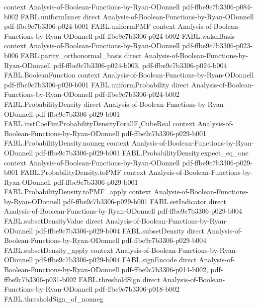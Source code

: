 \begin{theorem}
  {context}
  {Analysis-of-Boolean-Functions-by-Ryan-ODonnell}
  {pdf-ffbe9c7b3306-p084-b002}
\proofstep
  {FABL.uniformInner}
  {direct}
  {Analysis-of-Boolean-Functions-by-Ryan-ODonnell}
  {pdf-ffbe9c7b3306-p024-b001}
\proofstep
  {FABL.uniformPMF}
  {context}
  {Analysis-of-Boolean-Functions-by-Ryan-ODonnell}
  {pdf-ffbe9c7b3306-p024-b002}
\proofstep
  {FABL.walshBasis}
  {context}
  {Analysis-of-Boolean-Functions-by-Ryan-ODonnell}
  {pdf-ffbe9c7b3306-p023-b006}
\proofstep
  {FABL.parity_orthonormal_basis}
  {direct}
  {Analysis-of-Boolean-Functions-by-Ryan-ODonnell}
  {pdf-ffbe9c7b3306-p024-b003,
    pdf-ffbe9c7b3306-p024-b004}
\proofstep
  {FABL.BooleanFunction}
  {context}
  {Analysis-of-Boolean-Functions-by-Ryan-ODonnell}
  {pdf-ffbe9c7b3306-p020-b001}
\proofstep
  {FABL.uniformProbability}
  {direct}
  {Analysis-of-Boolean-Functions-by-Ryan-ODonnell}
  {pdf-ffbe9c7b3306-p024-b002}
\proofstep
  {FABL.ProbabilityDensity}
  {direct}
  {Analysis-of-Boolean-Functions-by-Ryan-ODonnell}
  {pdf-ffbe9c7b3306-p029-b001}
\proofstep
  {FABL.instCoeFunProbabilityDensityForallF₂CubeReal}
  {context}
  {Analysis-of-Boolean-Functions-by-Ryan-ODonnell}
  {pdf-ffbe9c7b3306-p029-b001}
\proofstep
  {FABL.ProbabilityDensity.nonneg}
  {context}
  {Analysis-of-Boolean-Functions-by-Ryan-ODonnell}
  {pdf-ffbe9c7b3306-p029-b001}
\proofstep
  {FABL.ProbabilityDensity.expect_eq_one}
  {context}
  {Analysis-of-Boolean-Functions-by-Ryan-ODonnell}
  {pdf-ffbe9c7b3306-p029-b001}
\proofstep
  {FABL.ProbabilityDensity.toPMF}
  {context}
  {Analysis-of-Boolean-Functions-by-Ryan-ODonnell}
  {pdf-ffbe9c7b3306-p029-b001}
\proofstep
  {FABL.ProbabilityDensity.toPMF_apply}
  {context}
  {Analysis-of-Boolean-Functions-by-Ryan-ODonnell}
  {pdf-ffbe9c7b3306-p029-b001}
\proofstep
  {FABL.setIndicator}
  {direct}
  {Analysis-of-Boolean-Functions-by-Ryan-ODonnell}
  {pdf-ffbe9c7b3306-p029-b004}
\proofstep
  {FABL.subsetDensityValue}
  {direct}
  {Analysis-of-Boolean-Functions-by-Ryan-ODonnell}
  {pdf-ffbe9c7b3306-p029-b004}
\proofstep
  {FABL.subsetDensity}
  {direct}
  {Analysis-of-Boolean-Functions-by-Ryan-ODonnell}
  {pdf-ffbe9c7b3306-p029-b004}
\proofstep
  {FABL.subsetDensity_apply}
  {context}
  {Analysis-of-Boolean-Functions-by-Ryan-ODonnell}
  {pdf-ffbe9c7b3306-p029-b004}
\proofstep
  {FABL.signEncode}
  {direct}
  {Analysis-of-Boolean-Functions-by-Ryan-ODonnell}
  {pdf-ffbe9c7b3306-p014-b002,
    pdf-ffbe9c7b3306-p031-b002}
\proofstep
  {FABL.thresholdSign}
  {direct}
  {Analysis-of-Boolean-Functions-by-Ryan-ODonnell}
  {pdf-ffbe9c7b3306-p018-b002}
\proofstep
  {FABL.thresholdSign_of_nonneg}

\end{theorem}
